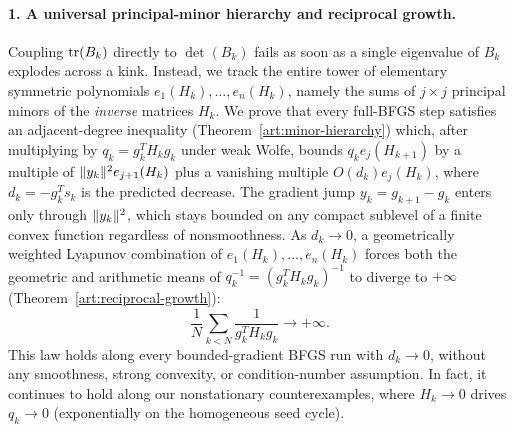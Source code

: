 \paragraph{1. A universal principal-minor hierarchy and reciprocal growth.}
Coupling $\operatorname{tr}(B_k)$ directly to $\det(B_k)$ fails as soon as a single
eigenvalue of $B_k$ explodes across a kink. Instead, we track the entire tower
of elementary symmetric polynomials $e_1(H_k),\ldots,e_n(H_k)$, namely the sums
of $j\times j$ principal minors of the \emph{inverse} matrices $H_k$. We prove
that every full-BFGS step satisfies an adjacent-degree inequality
(Theorem~\ref{art:minor-hierarchy}) which, after multiplying by
$q_k=g_k^TH_kg_k$ under weak Wolfe, bounds $q_ke_j(H_{k+1})$ by a multiple of
$\lVert y_k\rVert^2e_{j+1}(H_k)$ plus a vanishing multiple $O(d_k)e_j(H_k)$, where
$d_k=-g_k^Ts_k$ is the predicted decrease. The gradient jump
$y_k=g_{k+1}-g_k$ enters only through $\lVert y_k\rVert^2$, which stays bounded on
any compact sublevel of a finite convex function regardless of nonsmoothness.
As $d_k\to0$, a geometrically weighted Lyapunov combination of
$e_1(H_k),\ldots,e_n(H_k)$ forces both the geometric and arithmetic means of
$q_k^{-1}=(g_k^TH_kg_k)^{-1}$ to diverge to $+\infty$
(Theorem~\ref{art:reciprocal-growth}):
\[
 \frac1N\sum_{k<N}\frac{1}{g_k^TH_kg_k}\longrightarrow+\infty.
\]
This law holds along every bounded-gradient BFGS run with $d_k\to0$,
without any smoothness, strong convexity, or condition-number assumption. In
fact, it continues to hold along our nonstationary counterexamples, where
$H_k\to0$ drives $q_k\to0$ (exponentially on the homogeneous seed cycle).


